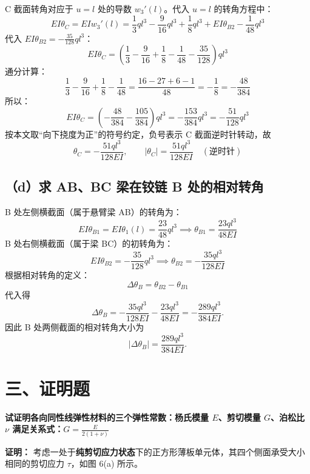 \documentclass[UTF8,fontset=windows]{ctexart}
\begin{document}
C 截面转角对应于 $u=l$ 处的导数 $w_3'(l)$。代入 $u=l$ 的转角方程中：
\[
    EI \theta_C = EI w_3'(l) = \frac{1}{3} q l^3 - \frac{9}{16} ql^3 + \frac{1}{8} ql^3 + EI \theta_{B2} - \frac{1}{48} ql^3
\]
代入 $EI \theta_{B2} = -\frac{35}{128} ql^3$：
\[
    EI \theta_C = \left( \frac{1}{3} - \frac{9}{16} + \frac{1}{8} - \frac{1}{48} - \frac{35}{128} \right) ql^3
\]
通分计算：
\[
    \frac{1}{3} - \frac{9}{16} + \frac{1}{8} - \frac{1}{48}
    = \frac{16 - 27 + 6 - 1}{48}
    = -\frac{1}{8}
    = -\frac{48}{384}
\]
所以：
\[
    EI \theta_C = \left( -\frac{48}{384} - \frac{105}{384} \right) ql^3 = -\frac{153}{384} ql^3 = -\frac{51}{128} ql^3
\]
按本文取“向下挠度为正”的符号约定，负号表示 C 截面逆时针转动，故
\[
    \theta_C = -\frac{51ql^3}{128EI},\qquad |\theta_C|=\frac{51ql^3}{128EI}\quad (\text{逆时针})
\]

\subsection*{（d）求 AB、BC 梁在铰链 B 处的相对转角}

B 处左侧横截面（属于悬臂梁 AB）的转角为：
\[
    EI \theta_{B1} = EI \theta_1(l) = \frac{23}{48} ql^3 \implies \theta_{B1} = \frac{23ql^3}{48EI}
\]
B 处右侧横截面（属于梁 BC）的初转角为：
\[
    EI \theta_{B2} = -\frac{35}{128} ql^3 \implies \theta_{B2} = -\frac{35ql^3}{128EI}
\]
根据相对转角的定义：
\[
    \Delta \theta_B = \theta_{B2} - \theta_{B1}
\]
代入得
\[
    \Delta\theta_B
    =
    -\frac{35ql^3}{128EI}
    -
    \frac{23ql^3}{48EI}
    =
    -\frac{289ql^3}{384EI}.
\]
因此 B 处两侧截面的相对转角大小为
\[
    |\Delta\theta_B|=\frac{289ql^3}{384EI}.
\]

\newpage

\section*{三、证明题}

\textbf{试证明各向同性线弹性材料的三个弹性常数：杨氏模量 $E$、剪切模量 $G$、泊松比 $\nu$ 满足关系式：$G = \frac{E}{2(1 + \nu)}$}

\textbf{证明：}
考虑一处于\textbf{纯剪切应力状态}下的正方形薄板单元体，其四个侧面承受大小相同的剪切应力 $\tau$，如图 6(a) 所示。
\end{document}
